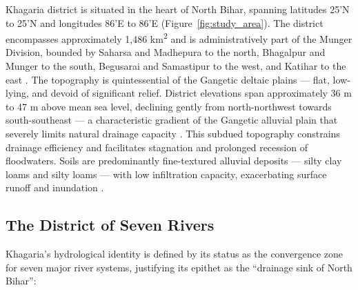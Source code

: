 \documentclass[12pt, a4paper]{article}
\begin{document}
Khagaria district is situated in the heart of North Bihar, spanning latitudes 25'N to 25'N and longitudes 86'E to 86'E (Figure~\ref{fig:study_area}). The district encompasses approximately 1,486 km\textsuperscript{2} and is administratively part of the Munger Division, bounded by Saharsa and Madhepura to the north, Bhagalpur and Munger to the south, Begusarai and Samastipur to the west, and Katihar to the east \citep{khagdist2024}. The topography is quintessential of the Gangetic deltaic plains --- flat, low-lying, and devoid of significant relief. District elevations span approximately 36 m to 47 m above mean sea level, declining gently from north-northwest towards south-southeast --- a characteristic gradient of the Gangetic alluvial plain that severely limits natural drainage capacity \citep{khagdist2024}. This subdued topography constrains drainage efficiency and facilitates stagnation and prolonged recession of floodwaters. Soils are predominantly fine-textured alluvial deposits --- silty clay loams and silty loams --- with low infiltration capacity, exacerbating surface runoff and inundation \citep{NBSSLUPbihar2020}.

\subsection{The District of Seven Rivers}

Khagaria's hydrological identity is defined by its status as the convergence zone for seven major river systems, justifying its epithet as the ``drainage sink of North Bihar'':
\end{document}
